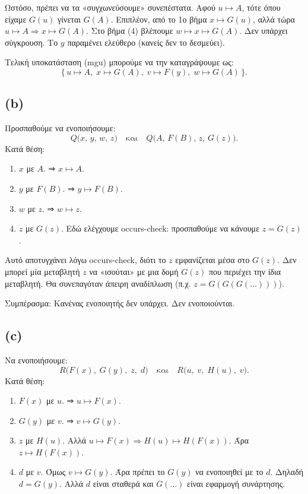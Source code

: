\documentclass[a4paper,12pt]{article}
\begin{document}
Ωστόσο, πρέπει να τα «συγχωνεύσουμε» συνεπέστατα. Αφού $u \mapsto A$, τότε όπου είχαμε $G(u)$ γίνεται $G(A)$. Επιπλέον, από το 1ο βήμα $x \mapsto G(u)$, αλλά τώρα $u \mapsto A \Rightarrow x \mapsto G(A)$. Στο βήμα (4) βλέπουμε $w \mapsto x \mapsto G(A)$. Δεν υπάρχει σύγκρουση. Το $y$ παραμένει ελεύθερο (κανείς δεν το δεσμεύει).

Τελική υποκατάσταση (mgu) μπορούμε να την καταγράψουμε ως:
\[
\{\,u \mapsto A,\; x \mapsto G(A),\; v \mapsto F(y),\; w \mapsto G(A)\,\}.
\]

\subsection*{(b)}
Προσπαθούμε να ενοποιήσουμε:
\[
Q\bigl(x,\,y,\,w,\,z\bigr)\quad\text{και}\quad Q\bigl(A,\,F(B),\,z,\,G(z)\bigr).
\]
Κατά θέση:
\begin{enumerate}
    \item $x$ με $A$. ⇒ $x \mapsto A$.
    \item $y$ με $F(B)$. ⇒ $y \mapsto F(B)$.
    \item $w$ με $z$. ⇒ $w \mapsto z$.
    \item $z$ με $G(z)$. Εδώ ελέγχουμε occurs-check: προσπαθούμε να κάνουμε $z = G(z)$.
\end{enumerate}

Αυτό αποτυγχάνει λόγω occurs-check, διότι το $z$ εμφανίζεται μέσα στο $G(z)$. Δεν μπορεί μία μεταβλητή $z$ να «ισούται» με μια δομή $G(z)$ που περιέχει την ίδια μεταβλητή. Θα συνεπαγόταν άπειρη αναδίπλωση (π.χ. $z = G(G(G(\dots)))$).

Συμπέρασμα: Κανένας ενοποιητής δεν υπάρχει. Δεν ενοποιούνται.

\subsection*{(c)}
Να ενοποιήσουμε:
\[
R\bigl(F(x),\;G(y),\;z,\;d\bigr)\quad\text{και}\quad R\bigl(u,\;v,\;H(u),\;v\bigr).
\]
Κατά θέση:
\begin{enumerate}
    \item $F(x)$ με $u$. ⇒ $u \mapsto F(x)$.
    \item $G(y)$ με $v$. ⇒ $v \mapsto G(y)$.
    \item $z$ με $H(u)$. Αλλά $u \mapsto F(x) \Rightarrow H(u) \mapsto H(F(x))$. Άρα $z \mapsto H(F(x))$.
    \item $d$ με $v$. Όμως $v \mapsto G(y)$. Άρα πρέπει το $G(y)$ να ενοποιηθεί με το $d$. Δηλαδή $d = G(y)$. Αλλά $d$ είναι σταθερά και $G(\dots)$ είναι εφαρμογή συνάρτησης.
\end{enumerate}
\end{document}
